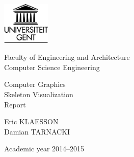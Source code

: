 

\begin{titlepage}

\setlength{\hoffset}{-1.3in}
\setlength{\voffset}{-1in}
\setlength{\topmargin}{1.5cm}
\setlength{\headheight}{0.5cm}
\setlength{\headsep}{1cm}
\setlength{\oddsidemargin}{3cm}
\setlength{\evensidemargin}{3cm}
\setlength{\footskip}{1.5cm}
\enlargethispage{1cm}

\fontsize{14pt}{16pt}
\selectfont

\begin{center}

\includegraphics[height=2cm]{fig/ruglogo}

\vspace{0.5cm}

Faculty of Engineering and Architecture\\
Computer Science Engineering\\

\vspace{3.5cm}

\fontsize{19.28pt}{23pt}
\selectfont

Computer Graphics\\ 
Skeleton Visualization\\
Report

\fontsize{14pt}{16pt}
\selectfont

\vspace{2.2cm}

Eric KLAESSON\\
Damian TARNACKI


\vspace{6.4cm}

Academic year 2014--2015

\end{center}
\end{titlepage}